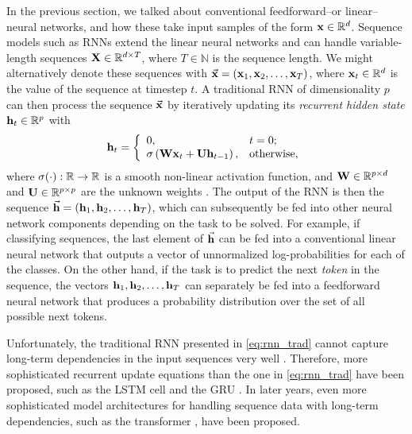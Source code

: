 \documentclass{statsmsc}
\begin{document}
{In the previous section, we talked about conventional feedforward--or linear--neural networks,
and how these take input samples of the form $\mathbf{x} \in \mathbb{R}^d$. Sequence models such as
\acfp{RNN} extend the linear neural networks and can handle variable-length sequences
$\mathbf{X} \in \mathbb{R}^{d \times T}$, where $T \in \mathbb{N}$ is the sequence length. We might alternatively
denote these sequences with $\vec{\mathbf{x}}=(\mathbf{x}_1,\mathbf{x}_2,\dots,\mathbf{x}_T)$, where $\mathbf{x}_t\in\mathbb{R}^d$ is the
value of the sequence at timestep $t$.
A traditional \ac{RNN} of dimensionality $p$ can then process the sequence $\vec{\mathbf{x}}$ by
iteratively updating its \textit{recurrent hidden state} $\mathbf{h}_t \in
\mathbb{R}^{p}$ with
\begin{equation}\label{eq:rnn_trad}
    \mathbf{h}_t=
    \left\{
        \begin{array}{ll}
            0, & t=0; \\
            \sigma\left(\mathbf{W}\mathbf{x}_t + \mathbf{U}\mathbf{h}_{t-1} \right), & \textrm{otherwise,}
        \end{array}
    \right.
\end{equation}
where $\sigma(\cdot): \mathbb{R} \rightarrow {\mathbb{R}}$ is a smooth non-linear activation function,
and $\mathbf{W} \in \mathbb{R}^{p \times d}$ and $\mathbf{U} \in \mathbb{R}^{p \times p}$ are the unknown
weights \citep{gru}.
The output of the \ac{RNN} is then the sequence
$\vec{\mathbf{h}}=\left(\mathbf{h}_1,\mathbf{h}_2,\dots,\mathbf{h}_T \right)$, which can subsequently be fed into other
neural network components depending on the task to be solved. For example, if
classifying sequences, the last element of $\vec{\mathbf{h}}$ can be fed into a conventional
linear neural network that outputs a vector of unnormalized log-probabilities for each of
the classes. On the other hand, if the task is to predict the next \textit{token} in the
sequence, the vectors $\mathbf{h}_1,\mathbf{h}_2,\dots,\mathbf{h}_T$ can separately be fed into a feedforward
neural network that produces a probability distribution over the set of all possible next tokens.

Unfortunately, the traditional \ac{RNN} presented in \cref{eq:rnn_trad} cannot
capture long-term dependencies in the input sequences very well
\citep{long_term_dep}. Therefore, more sophisticated recurrent update equations
than the one in \cref{eq:rnn_trad} have been proposed, such as the \ac{LSTM}
cell \citep{lstm} and the \ac{GRU} \citep{gru_cho}.
In later years, even more sophisticated model architectures for handling sequence data with
long-term dependencies, such as the transformer \citep{attention}, have been proposed.

}
\end{document}
